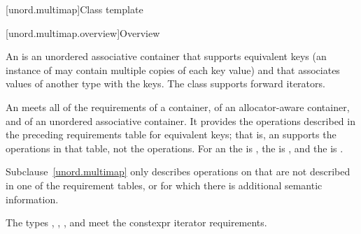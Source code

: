 [unord.multimap]{Class template }%

[unord.multimap.overview]{Overview}

\pnum
{}%
%
An  is an unordered associative container
that supports equivalent keys (an instance of  may contain
multiple copies of each key value) and that associates values of
another type  with the keys.
The  class
supports forward iterators.

\pnum
An  meets all of the requirements
of a container,
of an allocator-aware container, and
of an unordered associative container.
It provides the operations described in the
preceding requirements table for equivalent keys; that is, an 
supports the  operations in that table, not the  operations.
For an  the  is ,
the  is ,
and the  is .

\pnum
Subclause~\ref{unord.multimap} only describes operations on 
that are not described in one of the requirement tables, or for which
there is additional semantic information.

\pnum
The types , ,
, and  meet
the constexpr iterator requirements.

